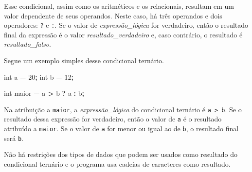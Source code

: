 \documentclass[
  11pt,
  a4paper,
]{scrbook}
\newenvironment{Shaded}{\begin{snugshade}}{\end{snugshade}}
\newcommand{\DataTypeTok}[1]{\textcolor[rgb]{0.13,0.29,0.53}{#1}}
\newcommand{\DecValTok}[1]{\textcolor[rgb]{0.00,0.00,0.81}{#1}}
\newcommand{\NormalTok}[1]{#1}
\newcommand{\OperatorTok}[1]{\textcolor[rgb]{0.81,0.36,0.00}{\textbf{#1}}}
\begin{document}
Esse condicional, assim como os aritméticos e os relacionais, resultam
em um valor dependente de seus operandos. Neste caso, há três operandos
e dois operadores: \texttt{?} e \texttt{:}. Se o valor de
\emph{expressão\_lógica} for verdadeiro, então o resultado final da
expressão é o valor \emph{resultado\_verdadeiro} e, caso contrário, o
resultado é \emph{resultado\_falso}.

Segue um exemplo simples desse condicional ternário.

\begin{Shaded}
\begin{Highlighting}[]
\DataTypeTok{int}\NormalTok{ a }\OperatorTok{=} \DecValTok{20}\OperatorTok{;}
\DataTypeTok{int}\NormalTok{ b }\OperatorTok{=} \DecValTok{12}\OperatorTok{;}

\DataTypeTok{int}\NormalTok{ maior }\OperatorTok{=}\NormalTok{ a }\OperatorTok{\textgreater{}}\NormalTok{ b }\OperatorTok{?}\NormalTok{ a }\OperatorTok{:}\NormalTok{ b}\OperatorTok{;}
\end{Highlighting}
\end{Shaded}

Na atribuição a \texttt{maior}, a \emph{expressão\_lógica} do
condicional ternário é \texttt{a\ \textgreater{}\ b}. Se o resultado
dessa expressão for verdadeiro, então o valor de \texttt{a} é o
resultado atribuído a \texttt{maior}. Se o valor de \texttt{a} for menor
ou igual ao de \texttt{b}, o resultado final será \texttt{b}.

Não há restrições dos tipos de dados que podem ser usados como resultado
do condicional ternário e o programa usa cadeias de caracteres como
resultado.
\end{document}
